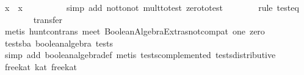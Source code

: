 \begin{isabellebody}
\ {}x\ {}\ {}x\ {}\ {}{}\isanewline
\ \ \ \ \ \ \isamarkupfalse%
\ {}simp\ add{}\ not{}to{}not\ mult{}to{}test\ zero{}to{}test{}\isanewline
\ \ \ \ \ \ \isamarkupfalse%
\ {}rule\ test{}eq{}\isanewline
\ \ \ \ \ \ \isamarkupfalse%
\ transfer\isanewline
\ \ \ \ \ \ \isamarkupfalse%
\ {}metis\ hunt{}con{}trans\ meet\ Boolean{}Algebra{}Extras{}not{}compat\ one\ zero{}\isanewline
\ \ \isamarkupfalse%
\isanewline
{}\isamarkupfalse%
%
\endisatagproof
{\isafoldproof}%
%
\isadelimproof
\isanewline
%
\endisadelimproof
\isanewline
{}\isamarkupfalse%
\ tests{}ba{}\ {}boolean{}algebra\ tests{}\isanewline
%
\isadelimproof
\ \ %
\endisadelimproof
%
\isatagproof
{}\isamarkupfalse%
\ {}simp\ add{}\ boolean{}algebra{}def{}\ metis\ tests{}complemented\ tests{}distributive{}%
\endisatagproof
{\isafoldproof}%
%
\isadelimproof
\isanewline
%
\endisadelimproof
\isanewline
{}\isamarkupfalse%
\ free{}kat{}{}\ {}kat{}\ free{}kat{}\isanewline

\end{isabellebody}
